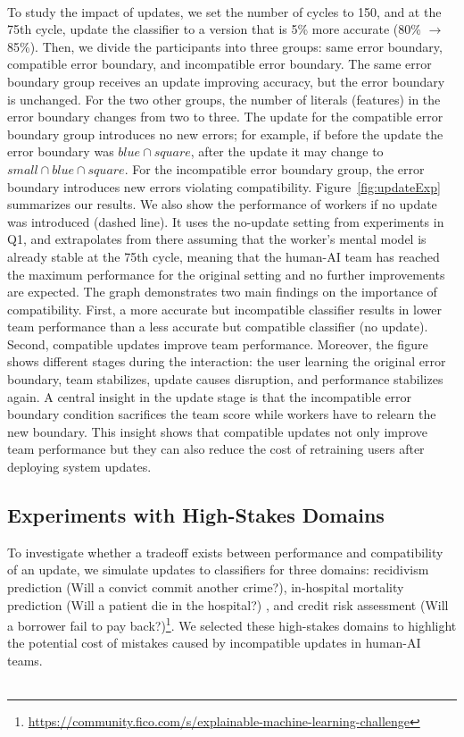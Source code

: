\documentclass[letterpaper]{article}
\begin{document}
\\
\noindent To study the impact of updates, we set the number of cycles to 150, and at the 75th cycle, update the classifier to a version that is 5\% more accurate (80\% $\rightarrow$ 85\%). Then, we divide the participants into three groups: same error boundary,
compatible error boundary, and incompatible error boundary. The same error boundary group receives an update improving accuracy, but the  error boundary is unchanged. For the two other groups, the number of literals (features) in the error boundary changes from two to three. The update for the compatible error boundary group introduces no new errors; for example, if before the update the error boundary was $blue \cap square$, after the update it may change to $small \cap blue \cap square$. For the incompatible error boundary group, the error boundary introduces new errors violating compatibility. Figure~\ref{fig:updateExp} summarizes our results. We also show the performance of workers if no update was introduced (dashed line). It uses the no-update setting from experiments in Q1, and extrapolates from there assuming that the worker's mental model is already stable at the 75th cycle, meaning that the human-AI team has reached the maximum performance for the original setting and no further improvements are expected. The graph demonstrates two main findings on the importance of compatibility. First, a more accurate but incompatible classifier  results in lower team performance than a less accurate but compatible classifier (no update). Second, compatible updates improve team performance. Moreover, the figure shows different stages during the interaction: the user learning the original error boundary, team stabilizes, update causes disruption, and performance stabilizes again. A central insight in the update stage is that the incompatible error boundary condition sacrifices the team score while workers have to relearn the new boundary. This insight shows that compatible updates not only improve team performance but they can also reduce the cost of retraining users after deploying system updates.  


\subsection{Experiments with  High-Stakes Domains}
 To investigate whether a tradeoff exists between  performance and compatibility of an update, we simulate updates to classifiers for three domains: recidivism prediction (Will a convict commit another crime?)\cite{angwin2016machine}, in-hospital mortality prediction (Will a patient die in the hospital?) \cite{johnson2016mimic,harutyunyan2017multitask}, and credit risk assessment (Will a borrower fail to pay back?)\footnote{\url{https://community.fico.com/s/explainable-machine-learning-challenge}}. We selected these high-stakes domains to highlight the potential cost of mistakes caused by incompatible updates in human-AI teams.\\\\
\end{document}
